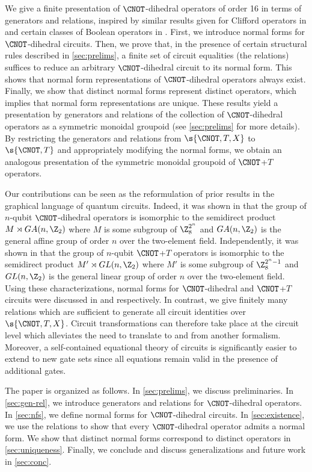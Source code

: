 \documentclass{eptcs}
\begin{document}
We give a finite presentation of $\CNOT$-dihedral operators of order
16 in terms of generators and relations, inspired by similar results
given for Clifford operators in \cite{Sel} and certain classes of
Boolean operators in \cite{Laf}. First, we introduce normal forms for
$\CNOT$-dihedral circuits. Then, we prove that, in the presence of
certain structural rules described in \cref{sec:prelims}, a finite set
of circuit equalities (the relations) suffices to reduce an arbitrary
$\CNOT$-dihedral circuit to its normal form. This shows that normal
form representations of $\CNOT$-dihedral operators always
exist. Finally, we show that distinct normal forms represent distinct
operators, which implies that normal form representations are unique.
These results yield a presentation by generators and relations of the
collection of $\CNOT$-dihedral operators as a symmetric monoidal
groupoid (see \cref{sec:prelims} for more details). By restricting the
generators and relations from $\s{\CNOT, T, X}$ to $\s{\CNOT, T}$ and
appropriately modifying the normal forms, we obtain an analogous
presentation of the symmetric monoidal groupoid of $\CNOT$+$T$
operators.

Our contributions can be seen as the reformulation of prior results in
the graphical language of quantum circuits. Indeed, it was shown in
\cite{CMBSG16} that the group of $n$-qubit $\CNOT$-dihedral operators
is isomorphic to the semidirect product $M\rtimes GA(n,\Z_2)$ where
$M$ is some subgroup of $\Z_8^{2^n}$ and $GA(n,\Z_2)$ is the general
affine group of order $n$ over the two-element field. Independently,
it was shown in \cite{AM} that the group of $n$-qubit $\CNOT$+$T$
operators is isomorphic to the semidirect product
$M'\rtimes GL(n,\Z_2)$ where $M'$ is some subgroup of $\Z_8^{2^n-1}$
and $GL(n,\Z_2)$ is the general linear group of order $n$ over the
two-element field. Using these characterizations, normal forms for
$\CNOT$-dihedral and $\CNOT$+$T$ circuits were discussed in
\cite{CMBSG16} and \cite{CH161} respectively. In contrast, we give
finitely many relations which are sufficient to generate all circuit
identities over $\s{\CNOT, T, X}$. Circuit transformations can
therefore take place at the circuit level which alleviates the need to
translate to and from another formalism. Moreover, a self-contained
equational theory of circuits is significantly easier to extend to new
gate sets since all equations remain valid in the presence of
additional gates.

The paper is organized as follows. In \cref{sec:prelims}, we discuss
preliminaries. In \cref{sec:gen-rel}, we introduce generators and
relations for $\CNOT$-dihedral operators. In \cref{sec:nfs}, we define
normal forms for $\CNOT$-dihedral circuits. In \cref{sec:existence},
we use the relations to show that every $\CNOT$-dihedral operator
admits a normal form. We show that distinct normal forms correspond to
distinct operators in \cref{sec:uniqueness}. Finally, we conclude and
discuss generalizations and future work in \cref{sec:conc}.
\end{document}
